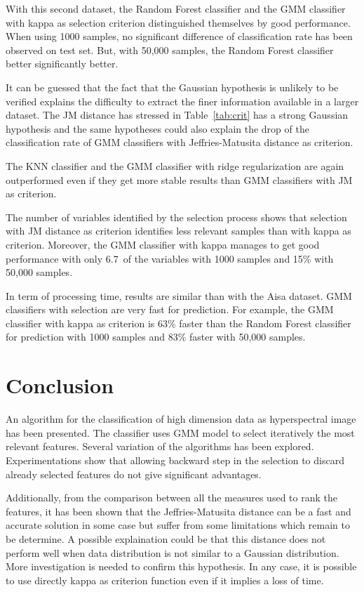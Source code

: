 \documentclass[journal,peerreview,onecolumn]{IEEEtran}
\begin{document}
    With this second dataset, the Random Forest classifier and the GMM classifier with kappa as selection criterion distinguished themselves by good performance. When using 1000 samples, no significant difference of classification rate has been observed on test set. But, with 50,000 samples, the Random Forest classifier better significantly better.

    It can be guessed that the fact that the Gaussian hypothesis is unlikely to be verified explains the difficulty to extract the finer information available in a larger dataset. The JM distance has stressed in Table~\ref{tab:crit} has a strong Gaussian hypothesis and the same hypotheses could also explain the drop of the classification rate of GMM classifiers with Jeffries-Matusita distance as criterion.

    The KNN classifier and the GMM classifier with ridge regularization are again outperformed even if they get more stable results than GMM classifiers with JM as criterion.

    The number of variables identified by the selection process shows that selection with JM distance as criterion identifies less relevant samples than with kappa as criterion. Moreover, the GMM classifier with kappa manages to get good performance with only 6.7\ of the variables with 1000 samples and 15\% with 50,000 samples.

    In term of processing time, results are similar than with the Aisa dataset. GMM classifiers with selection are very fast for prediction. For example, the GMM classifier with kappa as criterion is 63\% faster than the Random Forest classifier for prediction with 1000 samples and 83\% faster with 50,000 samples.

\section{Conclusion}

An algorithm for the classification of high dimension data as hyperspectral image has been presented. The classifier uses GMM model to select iteratively the most relevant features. Several variation of the algorithms has been explored. Experimentations show that allowing backward step in the selection to discard already selected features do not give significant advantages.

Additionally, from the comparison between all the measures used to rank the features, it has been shown that the Jeffries-Matusita distance can be a fast and accurate solution in some case but suffer from some limitations which remain to be determine. A possible explaination could be that this distance does not perform well when data distribution is not similar to a Gaussian distribution. More investigation is needed to confirm this hypothesis. In any case, it is possible to use directly kappa as criterion function even if it implies a loss of time.
\end{document}
